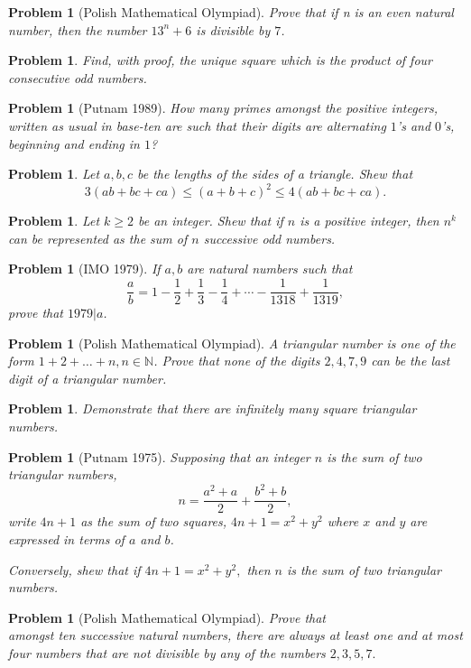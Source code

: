 \documentclass[11pt, openany]{book}
\theoremstyle{change} \theoremheaderfont{\blue\sffamily\bfseries}
\newtheorem{pro}[thm]{Problem}
\theoremstyle{nonumberplain} \theoremheaderfont{\sffamily\bfseries}
\newcommand{\BBN}{\mathbb{N}}
\newcommand{\í}{\'{\i}}
\begin{document}
\begin{multicols}{2}
\begin{pro}[Polish Mathematical Olympiad] Prove that if n is an
even natural number, then the number $13^n + 6$ is divisible by
$7$.\end{pro}
\begin{pro} Find, with proof, the unique square which is the product
of four consecutive odd numbers.\end{pro}

\begin{pro}[Putnam 1989] How many primes amongst the positive
integers, written as usual in base-ten are such that their digits
are alternating $1$'s and $0$'s, beginning and ending in $1$?
\end{pro}
\begin{pro} Let $a, b, c$ be the lengths of the sides of a triangle. Shew
that
$$ 3(ab + bc + ca) \leq (a + b + c)^2 \leq 4(ab + bc + ca).$$\end{pro}

\begin{pro} Let $k \geq 2$ be an integer. Shew that if $n$ is a positive integer, then
$n^k$ can be represented as the sum of $n$ successive odd
numbers.\end{pro}
\begin{pro}[IMO 1979] If $a, b$ are natural numbers such that
$$ \frac{a}{b} = 1 - \frac{1}{2} + \frac{1}{3} - \frac{1}{4} + \cdots - \frac{1}{1318} + \frac{1}{1319},$$
prove that $1979|a$.\end{pro}
\begin{pro}[Polish Mathematical Olympiad] A {\em triangular number} is one of the form $1 + 2 + \ldots + n,
n\in \BBN$. Prove that none of the digits $2, 4, 7, 9$ can be the
last digit of a triangular number.\end{pro}
\begin{pro}Demonstrate that there are infinitely many square triangular numbers.\end{pro}
\begin{pro}[Putnam 1975] Supposing that an integer $n$ is the sum
of two triangular numbers, $$ n = \frac{a^2 + a}{2} + \frac{b^2 +
b}{2},$$write $4n + 1$ as the sum of two squares, $4n + 1 = x^2 +
y^2$ where $x$ and $y$ are expressed in terms of $a$ and $b$.


Conversely, shew that if $4n + 1 = x^2 + y^2 ,$ then $n$ is the
sum of two triangular numbers.\end{pro}
\begin{pro}[Polish Mathematical Olympiad] Prove that \\
amongst ten successive natural numbers, there are always at least
one and at most four numbers that are not divisible by any of the
numbers $2, 3, 5, 7.$\end{pro}


\end{multicols}
\end{document}
